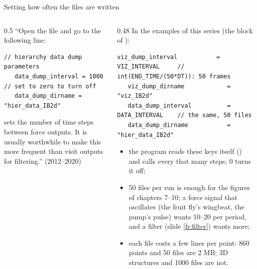 \documentclass[aspectratio=169,11pt]{beamer}
\begin{document}
\begin{frame}[fragile]{Setting how often the files are written}
\label{fr:interval}
\vspace{-1mm}
\begin{columns}[T,onlytextwidth]
\begin{column}{0.5\textwidth}
\small ``Open the  file and go to the following line:
\begin{lstlisting}[style=input]
// hierarchy data dump parameters
   data_dump_interval = 1000         // set to zero to turn off
   data_dump_dirname = "hier_data_IB2d"
\end{lstlisting}
 sets the number of time steps between force outputs. It is usually worthwhile to make this more frequent than visit outputs for filtering.'' (2012--2020)
\end{column}
\begin{column}{0.48\textwidth}
\footnotesize In the examples of this series (the  block of ):
\begin{lstlisting}[style=inputtiny]
   viz_dump_interval           = VIZ_INTERVAL     // int(END_TIME/(50*DT)): 50 frames
   viz_dump_dirname            = "viz_IB2d"
   data_dump_interval          = DATA_INTERVAL    // the same, 50 files
   data_dump_dirname           = "hier_data_IB2d"
\end{lstlisting}
\scriptsize
\begin{itemize}\setlength{\itemsep}{1pt}
  \item the program reads these keys itself () and calls  every that many steps; 0 turns it off;
  \item 50 files per run is enough for the figures of chapters 7--10; a force signal that oscillates (the fruit fly's wingbeat, the pump's pulse) wants 10--20 per period, and a filter (slide \ref{fr:filter}) wants more;
  \item each file costs a few lines per point: 860 points and 50 files are 2 MB; 3D structures and 1000 files are not.
\end{itemize}
\end{column}
\end{columns}
\end{frame}
\end{document}
